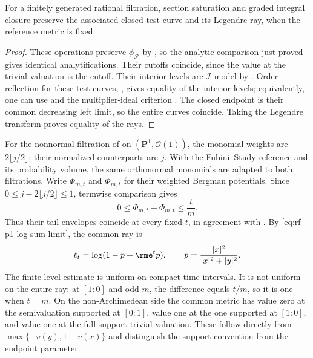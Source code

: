 \noindent\begin{minipage}{\linewidth}
\begin{corollary}\label{cor:rf-normalization-same-ray}
For a finitely generated rational filtration, section saturation and graded integral closure preserve the associated closed test curve and its Legendre ray, when the reference metric is fixed.
\end{corollary}
\end{minipage}\par

\begin{proof}
These operations preserve $\phi_{\mathcal F}$ by , so the analytic comparison just proved gives identical analytifications. Their cutoffs coincide, since the value at the trivial valuation is the cutoff. Their interior levels are $\mathcal I$-model by \cite[Lemma~4.5, p.~302]{DXZ23}. Order reflection for these test curves, \cite[Theorem~3.12(i), p.~294]{DXZ23}, gives equality of the interior levels; equivalently, one can use  and the multiplier-ideal criterion . The closed endpoint is their common decreasing left limit, so the entire curves coincide. Taking the Legendre transform proves equality of the rays.
\end{proof}

\begin{example}\label{ex:rf-normalization-bergman-error}
For the nonnormal filtration of  on $(\mathbf P^1,\mathcal O(1))$, the monomial weights are $2\lfloor j/2\rfloor$; their normalized counterparts are $j$. With the Fubini--Study reference and its probability volume, the same orthonormal monomials are adapted to both filtrations. Write $\Phi_{m,t}$ and $\overline\Phi_{m,t}$ for their weighted Bergman potentials. Since $0\leq j-2\lfloor j/2\rfloor\leq1$, termwise comparison gives
\[
        0\leq\overline\Phi_{m,t}-\Phi_{m,t}\leq\frac{t}{m}.
\]
Thus their tail envelopes coincide at every fixed $t$, in agreement with . By \eqref{eq:rf-p1-log-sum-limit}, the common ray is
\[
       \ell_t=\log(1-p+\rme^t p),\qquad
                 p=\frac{|x|^2}{|x|^2+|y|^2}.
\]
The finite-level estimate is uniform on compact time intervals. It is not uniform on the entire ray: at $[1:0]$ and odd $m$, the difference equals $t/m$, so it is one when $t=m$. On the non-Archimedean side the common metric has value zero at the semivaluation supported at $[0:1]$, value one at the one supported at $[1:0]$, and value one at the full-support trivial valuation. These follow directly from $\max\{-v(y),1-v(x)\}$ and distinguish the support convention from the endpoint parameter.
\end{example}

